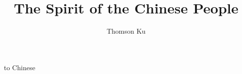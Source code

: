 \documentclass{Rinton-B9x6}
\newcommand{\doctitle}{The Spirit of the Chinese People}
\newcommand{\docauthor}{Thomson Ku}
\newcommand{\docsubject}{}
\newcommand{\doctitle}{春秋大義}
\newcommand{\docauthor}{辜鴻銘}
\newcommand{\docsubject}{中國人的精神}
\begin{document}
\titlepages %

\author{\docauthor}
\title{\doctitle}


\begin{dedication}
to Chinese
\end{dedication}

\begin{preface}

\end{preface}






\begin{tblofcontents}
\end{tblofcontents}





\end{document}
